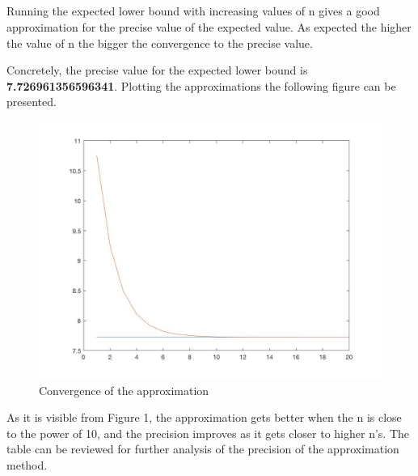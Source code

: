 \documentclass[10pt,oneside,a4paper]{article}
\begin{document}
\begin{flushleft}
\subsection{}
Running the expected lower bound with increasing values of n gives a good approximation for the precise value of the expected value. As expected the higher the value of n the bigger the convergence to the precise value. 

Concretely, the precise value for the expected lower bound is \textbf{7.726961356596341}. Plotting the approximations the following figure can be presented.

\begin{figure}[H]
\centering
        \includegraphics[totalheight=8cm]{convergence.jpg}
        \caption{Convergence of the approximation}
\end{figure}

As it is visible from Figure 1, the approximation gets better when the n is close to the power of 10, and the precision improves as it gets closer to higher n's.
\newline
\newline
The table can be reviewed for further analysis of the precision of the approximation method.


\end{flushleft}
\end{document}
